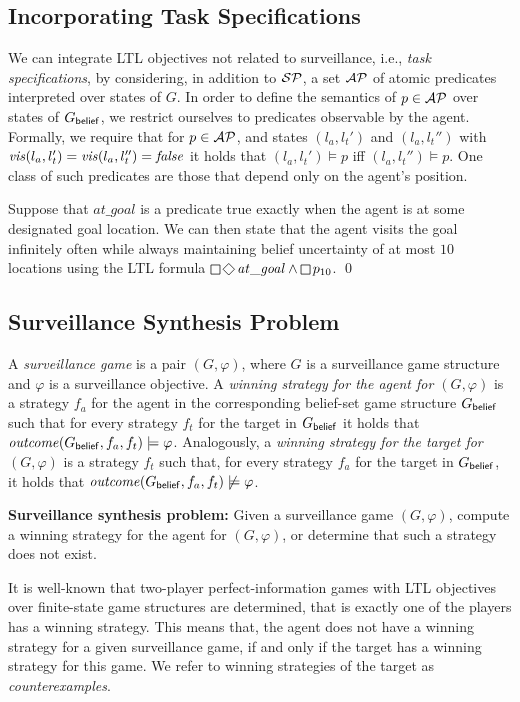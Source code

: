 \subsection{Incorporating Task Specifications}
We can integrate LTL objectives not related to surveillance, i.e., \emph{task specifications}, by considering, in addition to $\mathcal{SP}$, a set $\mathcal{AP}$ of atomic predicates interpreted over states of $G$. In order to define the semantics of $p \in \mathcal{AP}$ over states of $G_{\mathsf{belief}}$, we restrict ourselves to predicates observable by the agent. 
Formally, we require that for $p \in \mathcal{AP}$, and states $(l_a,l_t')$ and $(l_a,l_t'')$ with $\mathit{vis}(l_a,l_t')=\mathit{vis}(l_a,l_t'')=\mathit{false}$ it holds that $(l_a,l_t') \models p$ iff $(l_a,l_t'') \models p$. One class of such predicates are those that depend only on the agent's position.

\begin{example}
Suppose that $\mathit{at\_goal}$ is a predicate true exactly when the agent is at some designated goal location. We can then state that the agent visits the goal infinitely often while always maintaining belief uncertainty of at most $10$ locations using the LTL formula $\LTLglobally\LTLfinally \mathit{at\_goal} \wedge \LTLglobally p_{10}$.
\qed
\end{example}

\subsection{Surveillance Synthesis Problem}
A \emph{surveillance game} is a pair $(G,\varphi)$, where $G$ is a surveillance game structure and $\varphi$ is a surveillance objective. A \emph{winning strategy for the agent for $(G,\varphi)$} is a strategy $f_a$ for the agent in the corresponding belief-set game structure $G_{\mathsf{belief}}$ such that for every strategy $f_t$ for the target in $G_{\mathsf{belief}}$ it holds that $\mathit{outcome}(G_{\mathsf{belief}},f_a,f_t) \models \varphi$. Analogously, a \emph{winning strategy for the target for $(G,\varphi)$} is a strategy $f_t$ such that, for every strategy $f_a$ for the target in $G_{\mathsf{belief}}$, it holds that $\mathit{outcome}(G_{\mathsf{belief}},f_a,f_t) \not\models \varphi$.

{\bf Surveillance synthesis problem:} Given a surveillance game $(G,\varphi)$, compute a winning strategy for the agent for $(G,\varphi)$, or determine that such a strategy does not exist.


It is well-known that two-player perfect-information games with LTL objectives over finite-state game structures are determined, that is exactly one of the players has a winning strategy. This means that, the agent does not have a winning strategy for a given surveillance game, if and only if the target has a winning strategy for this game. We refer to winning strategies of the target as \emph{counterexamples}.